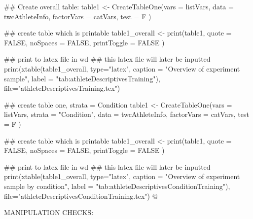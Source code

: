 ## Create overall table:
table1 <- CreateTableOne(vars = listVars,
                         data = twcAthleteInfo,
                         factorVars = catVars,
                         test = F
                         )

## create table which is printable
table1_overall <- print(table1,
                            quote = FALSE,
                            noSpaces = FALSE,
                            printToggle = FALSE
                            )

## print to latex file in wd
## this latex file will later be inputted
print(xtable(table1_overall, type="latex", caption = "Overview of experiment sample",
                    label = "tab:athleteDescriptivesTraining"),
                    file="athleteDescriptivesTraining.tex")

## create table one, strata = Condition
table1 <- CreateTableOne(vars = listVars,
                         strata = "Condition",
                         data = twcAthleteInfo,
                         factorVars = catVars,
                         test = F
                         )

## create table which is printable
table1_overall <- print(table1,
                            quote = FALSE,
                            noSpaces = FALSE,
                            printToggle = FALSE
                            )

## print to latex file in wd
## this latex file will later be inputted
print(xtable(table1_overall, type="latex",
                              caption = "Overview of experiment sample by condition",
                              label = "tab:athleteDescriptivesConditionTraining"),
                              file="athleteDescriptivesConditionTraining.tex")
@




MANIPULATION CHECKS:









